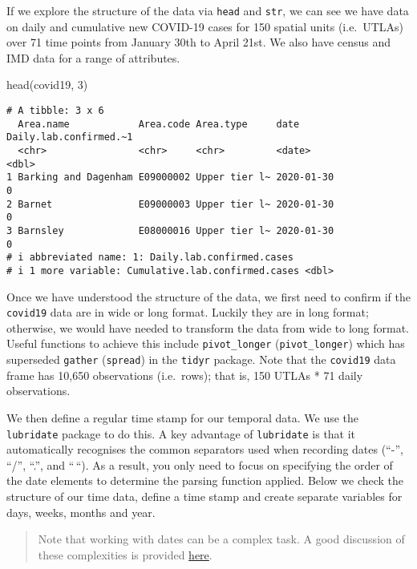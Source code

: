 \documentclass[
  letterpaper,
  krantz2]{style/krantz}
\newenvironment{Shaded}{\begin{snugshade}}{\end{snugshade}}
\newcommand{\DecValTok}[1]{\textcolor[rgb]{0.68,0.00,0.00}{#1}}
\newcommand{\FunctionTok}[1]{\textcolor[rgb]{0.28,0.35,0.67}{#1}}
\newcommand{\NormalTok}[1]{\textcolor[rgb]{0.00,0.23,0.31}{#1}}
\begin{document}
If we explore the structure of the data via \texttt{head} and
\texttt{str}, we can see we have data on daily and cumulative new
COVID-19 cases for 150 spatial units (i.e.~UTLAs) over 71 time points
from January 30th to April 21st. We also have census and IMD data for a
range of attributes.

\begin{Shaded}
\begin{Highlighting}[]
\FunctionTok{head}\NormalTok{(covid19, }\DecValTok{3}\NormalTok{)}
\end{Highlighting}
\end{Shaded}

\begin{verbatim}
# A tibble: 3 x 6
  Area.name            Area.code Area.type     date       Daily.lab.confirmed.~1
  <chr>                <chr>     <chr>         <date>                      <dbl>
1 Barking and Dagenham E09000002 Upper tier l~ 2020-01-30                      0
2 Barnet               E09000003 Upper tier l~ 2020-01-30                      0
3 Barnsley             E08000016 Upper tier l~ 2020-01-30                      0
# i abbreviated name: 1: Daily.lab.confirmed.cases
# i 1 more variable: Cumulative.lab.confirmed.cases <dbl>
\end{verbatim}

Once we have understood the structure of the data, we first need to
confirm if the \texttt{covid19} data are in wide or long format. Luckily
they are in long format; otherwise, we would have needed to transform
the data from wide to long format. Useful functions to achieve this
include \texttt{pivot\_longer} (\texttt{pivot\_longer}) which has
superseded \texttt{gather} (\texttt{spread}) in the \texttt{tidyr}
package. Note that the \texttt{covid19} data frame has 10,650
observations (i.e.~rows); that is, 150 UTLAs * 71 daily observations.

We then define a regular time stamp for our temporal data. We use the
\texttt{lubridate} package to do this. A key advantage of
\texttt{lubridate} is that it automatically recognises the common
separators used when recording dates (``-'', ``/'', ``.'', and ``\,``).
As a result, you only need to focus on specifying the order of the date
elements to determine the parsing function applied. Below we check the
structure of our time data, define a time stamp and create separate
variables for days, weeks, months and year.

\begin{quote}
Note that working with dates can be a complex task. A good discussion of
these complexities is provided
\href{http://uc-r.github.io/dates/\#convert_date}{here}.
\end{quote}
\end{document}
